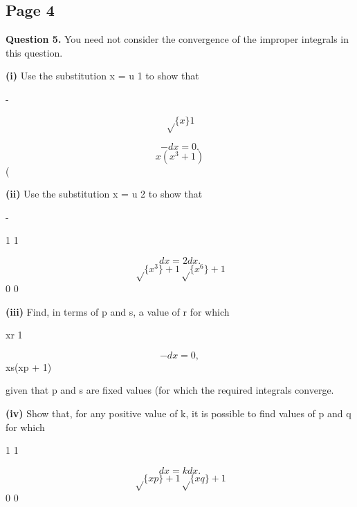 \documentclass[12pt]{article}
\begin{document}
\subsection*{Page 4}
\begin{flushleft}
\bigskip\textbf{Question 5.} You need not consider the convergence of the improper integrals in this question.\par
\textbf{(i)} Use the substitution x = u 1 to show that\par
-\par
\[\sqrt\{x\} 1\]
\infty\par
\[- dx = 0 .\]
\[x(x^3 + 1)\]
(\par
\textbf{(ii)} Use the substitution x = u 2 to show that\par
-\par
1 1\par
\infty \infty\par
\[dx = 2 dx .\]
\[\sqrt\{x^3\} + 1 \sqrt\{x^6\} + 1\]
0 0\par
\textbf{(iii)} Find, in terms of p and s, a value of r for which\par
xr 1\par
\infty\par
\[- dx = 0,\]
xs(xp + 1)\par
given that p and s are fixed values (for which the required integrals converge.\par
\textbf{(iv)} Show that, for any positive value of k, it is possible to find values of p and q for which\par
1 1\par
\infty \infty\par
\[dx = k dx .\]
\[\sqrt\{xp\} + 1 \sqrt\{xq\} + 1\]
0 0\par
\end{flushleft}
\end{document}
